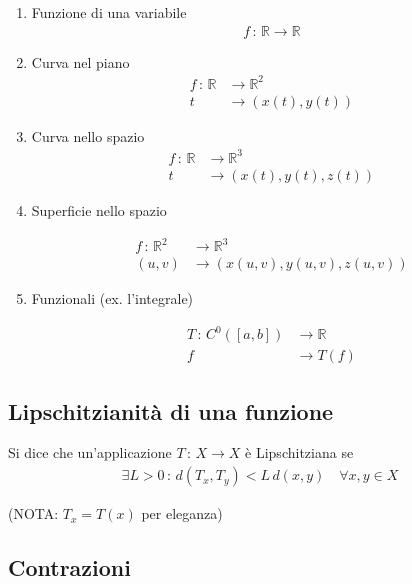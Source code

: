 \begin{enumerate}
	\item Funzione di una variabile
		\begin{align}
			f \, : \, \mathbb{R} \longrightarrow \mathbb{R}
		\end{align}
	\item Curva nel piano
		\begin{align}
			f \, : \, \mathbb{R} {}&\longrightarrow \mathbb{R}^2 \\
			t &\longrightarrow (x(t), y(t)) \nonumber
		\end{align}
	\item Curva nello spazio
		\begin{align}
			f \, : \, \mathbb{R} {}&\longrightarrow \mathbb{R}^3 \\
			t &\longrightarrow (x(t), y(t),z(t)) \nonumber
		\end{align}
	
	\item Superficie nello spazio
	
	\begin{align}
	f \, : \, \mathbb{R}^2 {}&\longrightarrow \mathbb{R}^3 \\
	(u,v) &\longrightarrow (x(u,v), y(u,v),z(u,v)) \nonumber
	\end{align}
	
	\item Funzionali (ex. l'integrale)
	
	\begin{align}
	T \, : \, C^0([a,b]) {}&\longrightarrow \mathbb{R} \\
	f &\longrightarrow T(f) \nonumber
	\end{align}
\end{enumerate}

\subsection{Lipschitzianità di una funzione}

Si dice che un'applicazione $T \, : \, X \longrightarrow X$ è Lipschitziana se 
\begin{align}
\exists L>0 \, : \, d(T_x, T_y) <L \, d(x,y) \quad \forall x,y \in X
\end{align}

(NOTA: $T_x= T(x)$ per eleganza)

\newpage

\subsection{Contrazioni}

